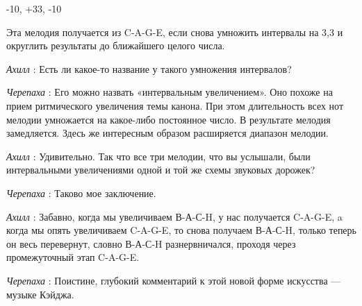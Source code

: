 -10, +33, -10

Эта мелодия получается из C-A-G-E, если снова умножить интервалы на 3,3 и округлить результаты до ближайшего целого числа.

\emph{Ахилл} : Есть ли какое-то название у такого умножения интервалов?

\emph{Черепаха} : Его можно назвать «интервальным увеличением». Оно похоже на прием ритмического увеличения темы канона. При этом длительность всех нот мелодии умножается на какое-либо постоянное число. В результате мелодия замедляется. Здесь же интересным образом расширяется диапазон мелодии.

\emph{Ахилл} : Удивительно. Так что все три мелодии, что вы услышали, были интервальными увеличениями одной и той же схемы звуковых дорожек?

\emph{Черепаха} : Таково мое заключение.

\emph{Ахилл} : Забавно, когда мы увеличиваем В-А-С-H, у нас получается C-A-G-E, a когда мы опять увеличиваем C-A-G-E, то снова получаем В-А-С-H, только теперь он весь перевернут, словно В-А-С-H разнервничался, проходя через промежуточный этап C-A-G-E.

\emph{Черепаха} : Поистине, глубокий комментарий к этой новой форме искусства --- музыке Кэйджа.

